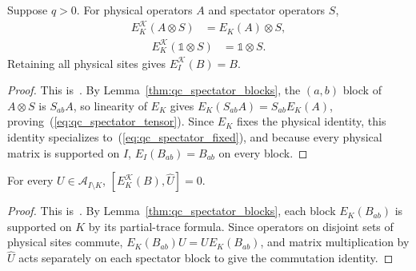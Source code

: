 \begin{lemma}
    \label{thm:qc_spectator_factors}
    \leanok
    Suppose $q>0$. For physical operators $A$ and spectator operators $S$,
    \begin{align}
        E_K^{\mathcal K}(A\otimes S) & =E_K(A)\otimes S,
        \label{eq:qc_spectator_tensor}
    \end{align}
    \begin{align}
        E_K^{\mathcal K}(\mathbb 1\otimes S) & =\mathbb 1\otimes S.
        \label{eq:qc_spectator_fixed}
    \end{align}
    Retaining all physical sites gives $E_I^{\mathcal K}(B)=B$.
\end{lemma}
\begin{proof}
    \leanok
    This is~\cite[``Preservation of spectator factors'']{QICLean2026Blueprint}.
    By Lemma~\ref{thm:qc_spectator_blocks}, the $(a,b)$ block of $A\otimes S$ is $S_{ab}A$, so linearity of $E_K$
    gives $E_K(S_{ab}A)=S_{ab}E_K(A)$, proving~(\ref{eq:qc_spectator_tensor}).
    Since $E_K$ fixes the physical identity, this identity
    specializes to~(\ref{eq:qc_spectator_fixed}), and because every physical
    matrix is supported on $I$, $E_I(B_{ab})=B_{ab}$ on every block.
\end{proof}

\begin{lemma}
    \label{thm:qc_spectator_commutant}
    \leanok
    For every $U\in\mathcal A_{I\setminus K}$,
    $[E_K^{\mathcal K}(B),\widehat U]=0$.
\end{lemma}
\begin{proof}
    \leanok
    This is~\cite[``Commutation on the averaged sites'']{QICLean2026Blueprint}.
    By Lemma~\ref{thm:qc_spectator_blocks}, each block $E_K(B_{ab})$ is supported on $K$ by its partial-trace
    formula. Since operators on disjoint sets of physical sites commute,
    $E_K(B_{ab})U=UE_K(B_{ab})$, and matrix multiplication by $\widehat U$
    acts separately on each spectator block to give the commutation identity.
\end{proof}

